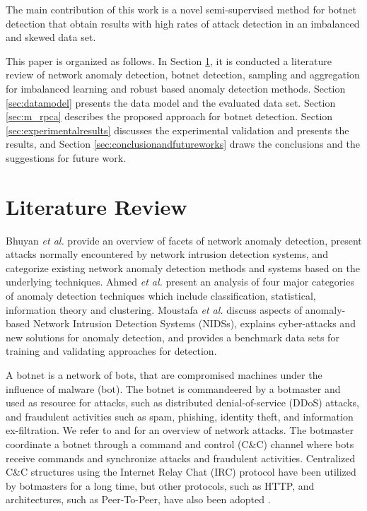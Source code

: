 \documentclass[review]{elsarticle}
\begin{document}
The main contribution of this work is a novel semi-supervised method for botnet detection that obtain results with high rates of attack detection in an imbalanced and skewed data set.

This paper is organized as follows. In Section \ref{sec:review}, it is conducted a literature review of network anomaly detection, botnet detection, sampling and aggregation for imbalanced learning and robust based anomaly detection methods. Section \ref{sec:datamodel} presents the data model and the evaluated data set. Section \ref{sec:m_rpca} describes the proposed approach for botnet detection. Section \ref{sec:experimentalresults} discusses the experimental validation and presents the results, and Section \ref{sec:conclusionandfutureworks} draws the conclusions and the suggestions for future work.

\section{Literature Review}
\label{sec:review}

Bhuyan \emph{et al.} \cite{bhuyan2014network} provide an overview of facets of network anomaly detection, present attacks normally encountered by network intrusion detection systems, and categorize existing network anomaly detection methods and systems based on the underlying techniques. Ahmed \emph{et al.} \cite{ahmed2016survey} present an analysis of four major categories of anomaly detection techniques which include classification, statistical, information theory and clustering. Moustafa \emph{et al.} \cite{moustafa2019holistic} discuss aspects of anomaly-based Network Intrusion Detection Systems (NIDSs), explains cyber-attacks and new solutions for anomaly detection, and provides a benchmark data sets for training and validating approaches for detection. 

A botnet is a network of bots, that are compromised machines under the influence of malware (bot). The botnet is commandeered by a botmaster and used as resource for attacks, such as distributed denial-of-service (DDoS) attacks, and fraudulent activities such as spam, phishing, identity theft, and information ex-filtration. We refer to \cite{ahmed2016survey} and \cite{moustafa2019holistic} for an overview of network attacks. The botmaster coordinate a botnet through a command and control (C\&C) channel where bots receive commands and synchronize attacks and fraudulent activities. Centralized C\&C structures using the Internet Relay Chat (IRC) protocol have been utilized by botmasters for a long time, but other protocols, such as HTTP, and architectures, such as Peer-To-Peer, have also been adopted \cite{gu2008botminer}.
\end{document}
